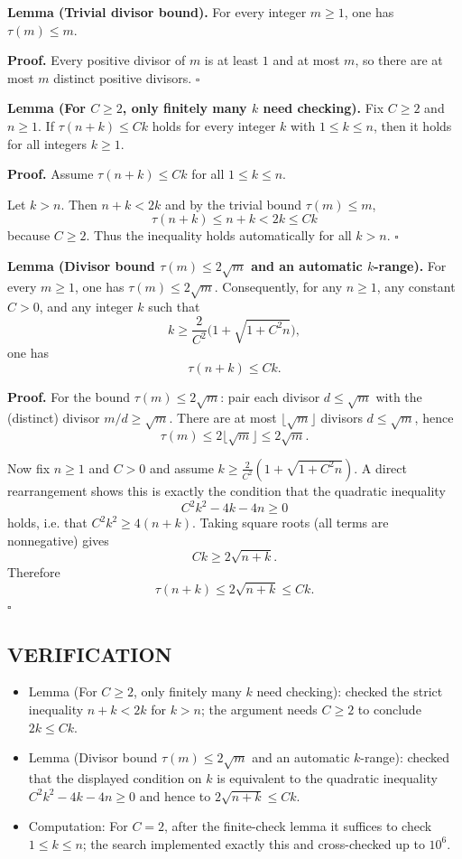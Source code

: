 \noindent\textbf{Lemma (Trivial divisor bound).}
For every integer $m\ge 1$, one has $\tau(m)\le m$.

\noindent\textbf{Proof.}
Every positive divisor of $m$ is at least $1$ and at most $m$, so there are at most $m$ distinct positive divisors.
\hfill$\square$


\noindent\textbf{Lemma (For $C\ge 2$, only finitely many $k$ need checking).}
Fix $C\ge 2$ and $n\ge 1$. If $\tau(n+k)\le Ck$ holds for every integer $k$ with $1\le k\le n$, then it holds for all integers $k\ge 1$.

\noindent\textbf{Proof.}
Assume $\tau(n+k)\le Ck$ for all $1\le k\le n$.

Let $k>n$. Then $n+k < 2k$ and by the trivial bound $\tau(m)\le m$,
\[
\tau(n+k)\le n+k < 2k \le Ck
\]
because $C\ge 2$. Thus the inequality holds automatically for all $k>n$.
\hfill$\square$


\noindent\textbf{Lemma (Divisor bound $\tau(m)\le 2\sqrt m$ and an automatic $k$-range).}
For every $m\ge 1$, one has $\tau(m)\le 2\sqrt m$. Consequently, for any $n\ge 1$, any constant $C>0$, and any integer $k$ such that
\[
k \ge \frac{2}{C^2}\bigl(1+\sqrt{1+C^2 n}\bigr),
\]
one has
\[
\tau(n+k)\le Ck.
\]

\noindent\textbf{Proof.}
For the bound $\tau(m)\le 2\sqrt m$: pair each divisor $d\le \sqrt m$ with the (distinct) divisor $m/d\ge \sqrt m$. There are at most $\lfloor \sqrt m\rfloor$ divisors $d\le \sqrt m$, hence
\[
\tau(m)\le 2\lfloor \sqrt m\rfloor \le 2\sqrt m.
\]

Now fix $n\ge 1$ and $C>0$ and assume $k\ge \frac{2}{C^2}(1+\sqrt{1+C^2 n})$. A direct rearrangement shows this is exactly the condition that the quadratic inequality
\[
C^2k^2-4k-4n\ge 0
\]
holds, i.e. that $C^2k^2\ge 4(n+k)$. Taking square roots (all terms are nonnegative) gives
\[
Ck\ge 2\sqrt{n+k}.
\]
Therefore
\[
\tau(n+k)\le 2\sqrt{n+k}\le Ck.
\]
\hfill$\square$


\subsection*{VERIFICATION}
\begin{itemize}
\item Lemma (For $C\ge 2$, only finitely many $k$ need checking): checked the strict inequality $n+k<2k$ for $k>n$; the argument needs $C\ge 2$ to conclude $2k\le Ck$.
\item Lemma (Divisor bound $\tau(m)\le 2\sqrt m$ and an automatic $k$-range): checked that the displayed condition on $k$ is equivalent to the quadratic inequality $C^2k^2-4k-4n\ge 0$ and hence to $2\sqrt{n+k}\le Ck$.
\item Computation: For $C=2$, after the finite-check lemma it suffices to check $1\le k\le n$; the search implemented exactly this and cross-checked up to $10^6$.
\end{itemize}

